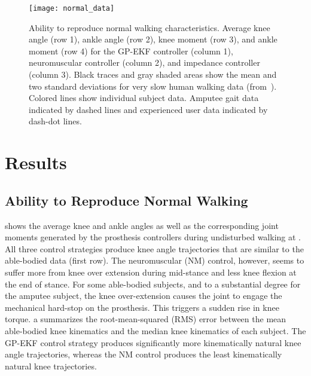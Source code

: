 \begin{figure*}[t]
    \centering
    \texttt{[image: normal\_data]} 
    \caption[Ability to reproduce normal walking characteristics]{Ability to
    reproduce normal walking characteristics. Average knee angle (row 1), ankle
    angle (row 2), knee moment (row 3), and ankle moment (row 4) for the GP-EKF
    controller (column 1), neuromuscular controller (column 2), and impedance
    controller (column 3). Black traces and gray shaded areas show the mean and
    two standard deviations for very slow human walking data
    (from~\citep{bovi2011multiple}). Colored lines show individual subject data.
    Amputee gait data indicated by dashed lines and experienced user data
    indicated by dash-dot lines.}\label{fig:controller_comparison}
\end{figure*}

\section{Results}\label{sec:phase_est_results}
\subsection{Ability to Reproduce Normal Walking}

 shows the average knee and ankle angles as well
as the corresponding joint moments generated by the prosthesis controllers
during undisturbed walking at . All three control strategies
produce knee angle trajectories that are similar to the able-bodied data (first
row). The neuromuscular (NM) control, however, seems to suffer more from knee
over extension during mid-stance and less knee flexion at the end of stance. For
some able-bodied subjects, and to a substantial degree for the amputee subject,
the knee over-extension causes the joint to engage the mechanical hard-stop on
the prosthesis. This triggers a sudden rise in knee torque.
a summarizes the root-mean-squared (RMS) error
between the mean able-bodied knee kinematics and the median knee kinematics of
each subject. The GP-EKF control strategy produces significantly more
kinematically natural knee angle trajectories, whereas the NM control produces
the least kinematically natural knee trajectories. 

